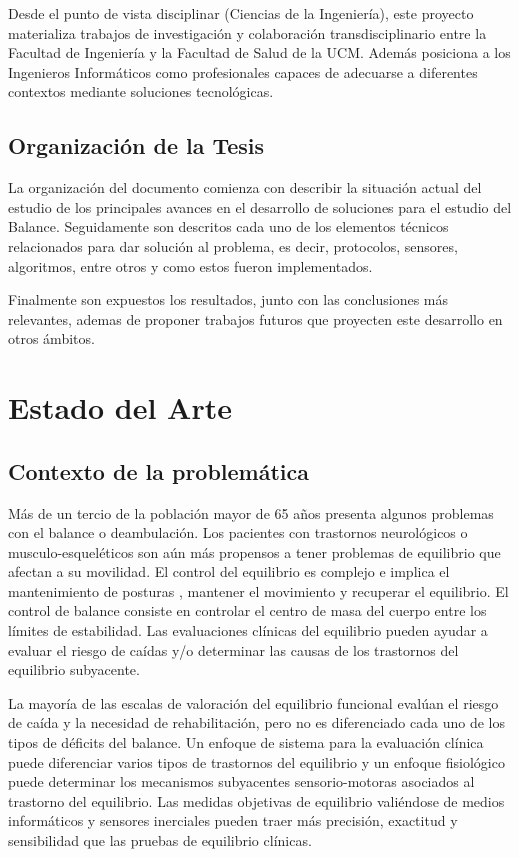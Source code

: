 \documentclass[12pt,a4paper]{article}
\begin{document}
Desde el punto de vista disciplinar (Ciencias de la Ingeniería), este proyecto materializa trabajos de investigación y colaboración transdisciplinario entre la Facultad de Ingeniería y la Facultad de Salud de la UCM. Además posiciona a los Ingenieros Informáticos como profesionales capaces de adecuarse a diferentes contextos mediante soluciones tecnológicas.

\subsection{Organizaci\'on de la Tesis}
La organización del documento comienza con describir la situación actual del estudio de los principales avances en el desarrollo de soluciones para el estudio del Balance. Seguidamente son descritos cada uno de los elementos técnicos relacionados para dar solución al problema, es decir,  protocolos, sensores, algoritmos, entre otros y como estos fueron implementados.

Finalmente son expuestos los resultados, junto con las conclusiones más relevantes, ademas de proponer trabajos futuros que proyecten este desarrollo en otros ámbitos.


\section{Estado del Arte}

\subsection{Contexto de la problemática}
Más de un tercio de la población mayor de 65 años presenta algunos problemas con el balance o deambulación. Los pacientes con trastornos neurológicos o musculo-esqueléticos son aún más propensos a tener problemas de equilibrio que afectan a su movilidad.
El control del equilibrio es complejo e implica el mantenimiento de posturas \cite{mancini_relevance_2010}, mantener el movimiento y recuperar el equilibrio. El control de balance consiste en controlar el centro de masa del cuerpo entre los límites de estabilidad. Las evaluaciones clínicas del equilibrio pueden ayudar a evaluar el riesgo de caídas y/o determinar las causas de los trastornos del equilibrio subyacente.

La mayoría de las escalas de valoración del equilibrio funcional evalúan el riesgo de caída y la necesidad de rehabilitación, pero no es diferenciado cada uno de los tipos de déficits del balance. Un enfoque de sistema para la evaluación clínica puede diferenciar varios tipos de trastornos del equilibrio y un enfoque fisiológico puede determinar los mecanismos subyacentes sensorio-motoras asociados al trastorno del equilibrio. Las medidas objetivas de equilibrio valiéndose de medios informáticos y sensores inerciales pueden traer más precisión, exactitud y sensibilidad que las pruebas de equilibrio clínicas\cite{chaudhry_measurement_2011}.
\end{document}
